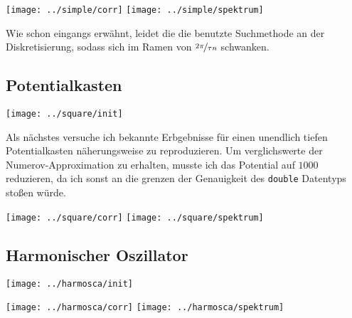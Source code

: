 \documentclass[10pt,a4paper,german]{scrartcl}
\begin{document}
			\texttt{[image: ../simple/corr]}
			\texttt{[image: ../simple/spektrum]}
			\begin{center}\end{center}
			
			Wie schon eingangs erwähnt, leidet die die benutzte Suchmethode an
			der Diskretisierung, sodass sich im Ramen von $\nicefrac{2\pi}{\tau n}$
			schwanken.
  	\subsection{Potentialkasten}
			\texttt{[image: ../square/init]}
			
			Als nächstes versuche ich bekannte Erbgebnisse für einen
			unendlich tiefen Potentialkasten näherungsweise zu reproduzieren.
			Um verglichswerte der Numerov-Approximation zu erhalten, musste ich
			das Potential auf $1000$ reduzieren, da ich sonst an die grenzen der
			Genauigkeit des \lstinline!double! Datentyps stoßen würde.
			
						

			\texttt{[image: ../square/corr]}
			\texttt{[image: ../square/spektrum]}
			\begin{center}\end{center}
			
  	\subsection{Harmonischer Oszillator}
			\texttt{[image: ../harmosca/init]}
			
			
			
			\texttt{[image: ../harmosca/corr]}
			\texttt{[image: ../harmosca/spektrum]}
			\begin{center}\end{center}
\end{document}
